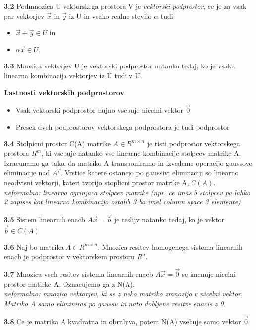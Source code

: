 \documentclass{article}
\begin{document}
\begin{multicols}{2}
	\textbf{3.2} Podmnozica U vektorskega prostora V je \textit{vektorski podprostor}, ce je za
	vsak par vektorjev $\vec{x}$ in $\vec{y}$ iz U in vsako realno stevilo $\alpha$ tudi
	\begin{itemize}
		\item $\vec{x} + \vec{y} \in U$ in
		\item $\alpha\vec{x} \in U$.
	\end{itemize}

	\textbf{3.3} Mnozica vektorjev U je vektorski podprostor natanko tedaj, ko je vsaka linearna
	kombinacija vektorjev iz U tudi v U.

	\textbf{Lastnosti vektorskih podprostorov}
	\begin{itemize}
		\item Vsak vektorski podprostor nujno vsebuje nicelni vektor $\vec{0}$
		\item Presek dveh podprostorov vektorskega podprostora je tudi podprostor
	\end{itemize}

	\textbf{3.4} Stolpicni prostor C(A) matrike $A \in R^{m \times n}$ je tisti podprostor
	vektorskega prostora $R^{m}$, ki vsebuje natanko vse linearne kombinacije stolpcev matrike A.\\
	Izracunamo ga tako, da matriko A transponiramo in izvedemo operacijo gaussove eliminacije nad $A^{T}$. Vrstice katere ostanejo po gaussivi eliminaciji
	so linearno neodvisni vektorji, kateri tvorijo stoplicni prostor matrike A, $C(A)$.
	\textit{neformalno: linearna ogrinjaca stolpcev matrike (npr. ce imas 5 stolpcev pa lahko 2 zapises kot linearno kombinacijo ostalih 3 bo imel column space 3 elemente)}

	\textbf{3.5} Sistem linearnih enacb $A\vec{x} = \vec{b}$ je reslijv natanko tedaj, ko je vektor
	$\vec{b} \in C(A)$

	\textbf{3.6} Naj bo matrika $A \in R^{m \times n}$. Mnozica resitev homogenega sistema linearnih
	enacb je podprostor v vektorskem prostoru $R^{n}$.

	\textbf{3.7} Mnozica vseh resitev sistema linearnih enacb $A\vec{x} = \vec{0}$ se imenuje nicelni
	prostor matirke A. Oznacujemo ga z N(A).\\
	\textit{neformalno: mnozica vektorjev, ki se z neko matriko zmnozijo v nicelni vektor. Matriko A samo eliminiras po gaussu in nato dobljene resitve enacis z 0.}

	\textbf{3.8} Ce je matrika A kvadratna in obrnljiva, potem N(A) vsebuje samo vektor $\vec{0}$


\end{multicols}
\end{document}
